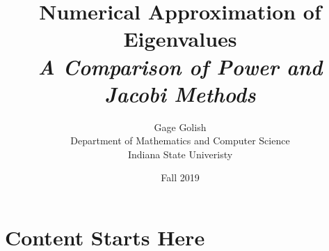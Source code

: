 \documentclass[12pt]{article}
\title{
  \textbf{Numerical Approximation of Eigenvalues}\\
  \Large \textit{A Comparison of Power and Jacobi Methods}
}
\author{
  Gage Golish\\
  Department of Mathematics and Computer Science\\
  Indiana State Univeristy
}
\date{Fall 2019}
\begin{document}
\maketitle
\thispagestyle{empty}

\pagebreak

\tableofcontents

\pagebreak

\section{Content Starts Here} 
\end{document}
